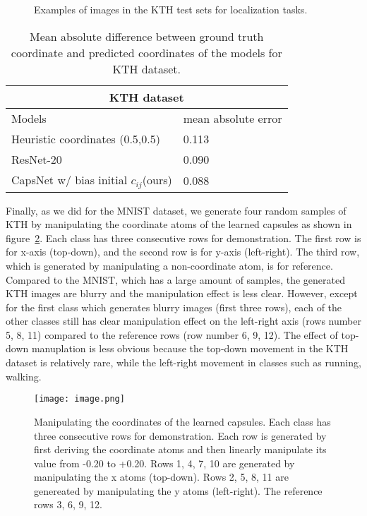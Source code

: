 \documentclass{article}
\begin{document}
\begin{figure}
\centering
{}
\caption{Examples of images in the KTH test sets for localization tasks. \label{fig:ex_kth}}
\end{figure}

\begin{table}
 \centering
 \begin{tabular}{ |p{4.5cm}||p{3cm}|}
  \hline
  \multicolumn{2}{|c|}{KTH dataset} \\
  \hline
  Models                                 & mean absolute error \\
  \hline
  Heuristic coordinates (0.5,0.5)        & 0.113 \\
  ResNet-20                              & 0.090 \\
  CapsNet w/ bias initial $c_{ij}$(ours) & 0.088 \\
  \hline
 \end{tabular}
 \caption{Mean absolute difference between ground truth coordinate and predicted coordinates of the models for KTH dataset.}
 \label{tab:2}
\end{table}

Finally, as we did for the MNIST dataset, we generate four random samples of KTH by manipulating the coordinate atoms of the learned capsules as shown in figure~\ref{fig:manipulate_kth}. Each class has three consecutive rows for demonstration. The first row is for x-axis (top-down), and the second row is for y-axis (left-right). The third row, which is generated by manipulating a non-coordinate atom, is for reference. Compared to the MNIST, which has a large amount of samples, the generated KTH images are blurry and the manipulation effect is less clear. However, except for the first class which generates blurry images (first three rows), each of the other classes still has clear manipulation effect on the left-right axis (rows number 5, 8, 11) compared to the reference rows (row number 6, 9, 12). The effect of top-down manuplation is less obvious because the top-down movement in the KTH dataset is relatively rare, while the left-right movement in classes such as running, walking.  

\begin{figure}
\centering
\texttt{[image: image.png]}
\caption{\label{fig:manipulate_kth} Manipulating the coordinates of the learned capsules. Each class has three consecutive rows for demonstration. Each row is generated by first deriving the coordinate atoms and then linearly manipulate its value from -0.20 to +0.20. Rows 1, 4, 7, 10 are generated by manipulating the x atoms (top-down). Rows 2, 5, 8, 11 are genereated by manipulating the y atoms (left-right). The reference rows 3, 6, 9, 12.}
\end{figure} 
\end{document}
